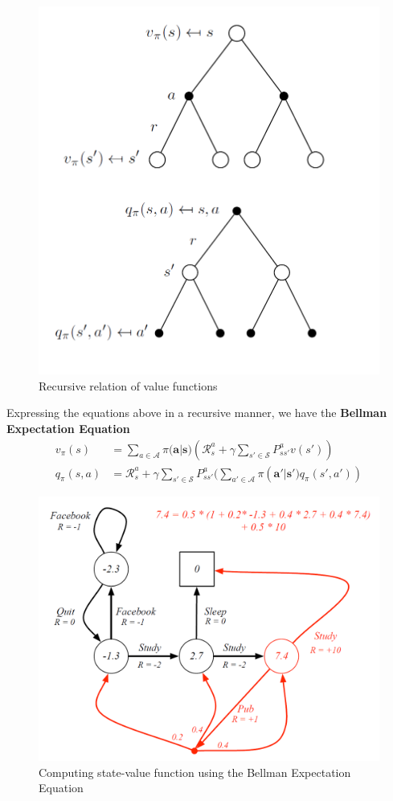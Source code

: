 \documentclass{article}
\begin{document}
	\begin{figure}[h]
		\centering
		\includegraphics[scale=0.5]{ch2fig3.png}
		\caption{Recursive relation of value functions}
	\end{figure}
	
	Expressing the equations above in a recursive manner, we have the \textbf{Bellman Expectation Equation} 
	\begin{align*}
	v_\pi(s) &= \sum_{a \in \mathcal{A}}  \pi(\mathbf{a|s)} (\mathcal{R}^a_s + \gamma \sum_{s' \in \mathcal{S}} P^a_{ss'}v(s'))\\
	q_\pi(s,a) &= \mathcal{R}^a_s + \gamma \sum_{s' \in \mathcal{S}} P^a_{ss'}(\sum_{a' \in \mathcal{A}}  \pi(\mathbf{a'|s')}q_\pi(s',a')) 
	\end{align*}
	
	\begin{figure}[h]
		\centering
		\includegraphics[scale=0.5]{ch2fig4.png}
		\caption{Computing state-value function using the Bellman Expectation Equation}
	\end{figure}
	
\end{document}
